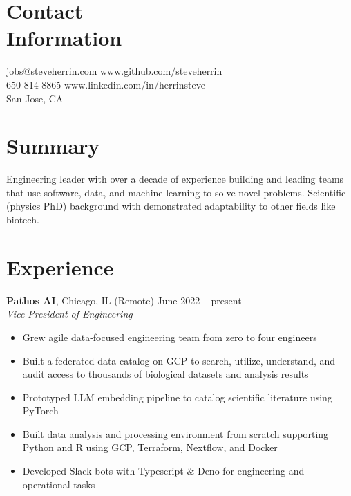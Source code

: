 \documentclass[margin,line]{resume}
\begin{document}
\begin{resume}

    \section{\mysidestyle Contact\\Information}

    jobs@steveherrin.com		\hfill www.github.com/steveherrin		\vspace{0mm}\\\vspace{0mm}%
    650-814-8865				\hfill www.linkedin.com/in/herrinsteve		\vspace{0mm}\\\vspace{-4.5mm}%
    San Jose, CA    				\hfill		\vspace{0mm}\\\vspace{0mm}%

    \section{\mysidestyle Summary}
    Engineering leader with over a decade of experience building and leading teams that use software, data, and machine learning to solve novel problems. Scientific (physics PhD) background with demonstrated adaptability to other fields like biotech.%
    \section{\mysidestyle Experience}
    \textbf{Pathos AI}, Chicago, IL (Remote) \hfill\vspace{1mm}\hfill June 2022 -- present\\%
    \textsl{Vice President of Engineering}
    \begin{itemize}
    \item Grew agile data-focused engineering team from zero to four engineers
    \item Built a federated data catalog on GCP to search, utilize, understand, and audit access to thousands of biological datasets and analysis results
    \item Prototyped LLM embedding pipeline to catalog scientific literature using PyTorch
    \item Built data analysis and processing environment from scratch supporting Python and R using GCP, Terraform, Nextflow, and Docker
    \item Developed Slack bots with Typescript \& Deno for engineering and operational tasks
    \end{itemize}


\end{resume}
\end{document}
